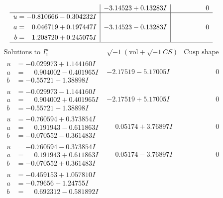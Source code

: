 \documentclass[1p]{elsarticle_modified}
\theoremstyle{definition}
\newcommand{\I}{\sqrt{-1}}
\begin{document}
$$\begin{array}{c|c|c}
 & -3.14523 + 0.13283 I & \phantom{-0.000000 } 0 \\ \hline\begin{aligned}
u &= -0.810666 - 0.304232 I \\
a &= \phantom{-}0.046719 + 0.197447 I \\
b &= \phantom{-}1.208720 + 0.245075 I\end{aligned}
 & -3.14523 - 0.13283 I & \phantom{-0.000000 } 0\\
 \hline 
 \end{array}$$\newpage$$\begin{array}{c|c|c}  
\text{Solutions to }I^u_{1}& \I (\text{vol} + \sqrt{-1}CS) & \text{Cusp shape}\\
 \hline 
\begin{aligned}
u &= -0.029973 + 1.144160 I \\
a &= \phantom{-}0.904002 - 0.401965 I \\
b &= -0.55721 + 1.38898 I\end{aligned}
 & -2.17519 - 5.17005 I & \phantom{-0.000000 } 0 \\ \hline\begin{aligned}
u &= -0.029973 - 1.144160 I \\
a &= \phantom{-}0.904002 + 0.401965 I \\
b &= -0.55721 - 1.38898 I\end{aligned}
 & -2.17519 + 5.17005 I & \phantom{-0.000000 } 0 \\ \hline\begin{aligned}
u &= -0.760594 + 0.373854 I \\
a &= \phantom{-}0.191943 - 0.611863 I \\
b &= -0.070552 - 0.361483 I\end{aligned}
 & \phantom{-}0.05174 + 3.76897 I & \phantom{-0.000000 } 0 \\ \hline\begin{aligned}
u &= -0.760594 - 0.373854 I \\
a &= \phantom{-}0.191943 + 0.611863 I \\
b &= -0.070552 + 0.361483 I\end{aligned}
 & \phantom{-}0.05174 - 3.76897 I & \phantom{-0.000000 } 0 \\ \hline\begin{aligned}
u &= -0.459153 + 1.057810 I \\
a &= -0.79656 + 1.24755 I \\
b &= \phantom{-}0.692312 - 0.581892 I\end{aligned}

\end{array}$$
\end{document}
